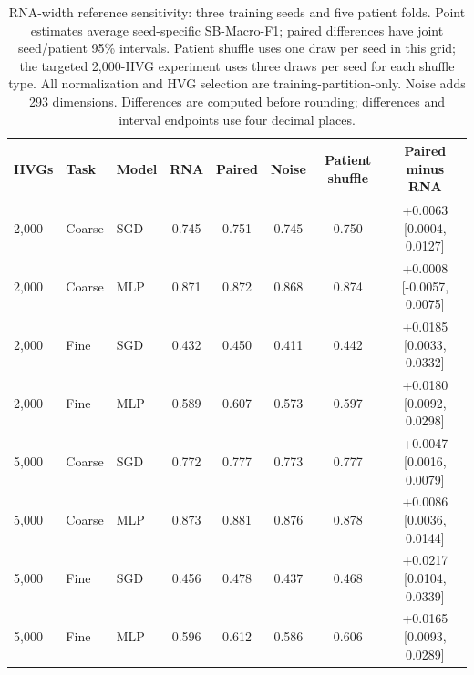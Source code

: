 \begin{table}[H]
\centering\small\setlength{\tabcolsep}{4pt}
\begin{tabular}{lllccccc}
\toprule
HVGs & Task & Model & RNA & Paired & Noise & Patient shuffle & Paired minus RNA \\
\midrule
2,000 & Coarse & SGD & 0.745 & 0.751 & 0.745 & 0.750 & +0.0063 [0.0004, 0.0127] \\
2,000 & Coarse & MLP & 0.871 & 0.872 & 0.868 & 0.874 & +0.0008 [-0.0057, 0.0075] \\
2,000 & Fine & SGD & 0.432 & 0.450 & 0.411 & 0.442 & +0.0185 [0.0033, 0.0332] \\
2,000 & Fine & MLP & 0.589 & 0.607 & 0.573 & 0.597 & +0.0180 [0.0092, 0.0298] \\
5,000 & Coarse & SGD & 0.772 & 0.777 & 0.773 & 0.777 & +0.0047 [0.0016, 0.0079] \\
5,000 & Coarse & MLP & 0.873 & 0.881 & 0.876 & 0.878 & +0.0086 [0.0036, 0.0144] \\
5,000 & Fine & SGD & 0.456 & 0.478 & 0.437 & 0.468 & +0.0217 [0.0104, 0.0339] \\
5,000 & Fine & MLP & 0.596 & 0.612 & 0.586 & 0.606 & +0.0165 [0.0093, 0.0289] \\
\bottomrule
\end{tabular}
\caption{RNA-width reference sensitivity: three training seeds and five patient folds. Point estimates average seed-specific SB-Macro-F1;
paired differences have joint seed/patient 95\% intervals. Patient shuffle
uses one draw per seed in this grid; the targeted 2,000-HVG experiment uses
three draws per seed for each shuffle type. All normalization and HVG selection
are training-partition-only. Noise adds 293 dimensions. Differences are computed
before rounding; differences and interval endpoints use four decimal places.}
\label{tab:rna_width_repeats}
\end{table}
